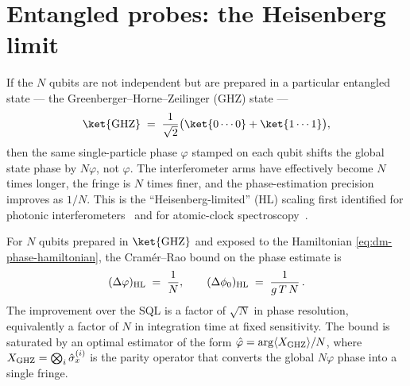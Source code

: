 \section{Entangled probes: the Heisenberg limit}
\label{sec:hl}

\begin{phenomenon}
If the $N$ qubits are not independent but are prepared in a
particular entangled state --- the Greenberger--Horne--Zeilinger
(GHZ) state ---
\begin{equation}
\label{eq:ghz}
\ket{\rm GHZ} \;=\; \frac{1}{\sqrt 2}\bigl(\ket{0\cdots 0}
+ \ket{1\cdots 1}\bigr),
\end{equation}
then the same single-particle phase $\varphi$ stamped on each
qubit shifts the global state phase by $N\varphi$, not
$\varphi$. The interferometer arms have effectively become
$N$ times longer, the fringe is $N$ times finer, and the
phase-estimation precision improves as $1/N$. This is the
``Heisenberg-limited'' (HL) scaling first identified for
photonic interferometers~\cite{caves1981,giovannetti2004,giovannetti2006}
and for atomic-clock spectroscopy~\cite{wineland1992,huelga1997}.
\end{phenomenon}

\begin{statement}
\label{stmt:hl}
For $N$ qubits prepared in $\ket{\rm GHZ}$ and exposed to the
Hamiltonian \cref{eq:dm-phase-hamiltonian}, the
Cram\'{e}r--Rao bound on the phase estimate is
\begin{equation}
\label{eq:hl-bound}
(\Delta\varphi)_{\rm HL} \;=\; \frac{1}{N},
\qquad
(\Delta\phi_0)_{\rm HL} \;=\; \frac{1}{g\,T\,N}\,.
\end{equation}
The improvement over the SQL is a factor of $\sqrt{N}$ in
phase resolution, equivalently a factor of $N$ in integration
time at fixed sensitivity. The bound is saturated by an optimal
estimator of the form $\hat\varphi=\arg\langle X_{\rm GHZ}\rangle/N$,
where $X_{\rm GHZ}=\bigotimes_i\hat\sigma_x^{(i)}$ is the
parity operator that converts the global $N\varphi$ phase into
a single fringe.
\end{statement}

